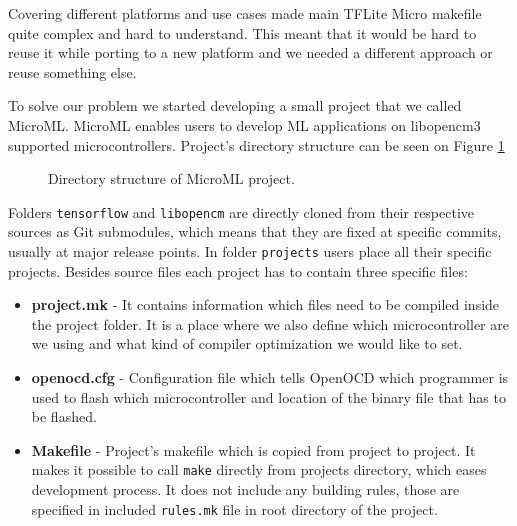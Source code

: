 Covering different platforms and use cases made main TFLite Micro makefile quite complex and hard to understand.
This meant that it would be hard to reuse it while porting to a new platform and we needed a different approach or reuse something else.

To solve our problem we started developing a small project that we called MicroML\footnotemark.
MicroML enables users to develop ML applications on libopencm3 supported microcontrollers.
Project's directory structure can be seen on Figure \ref{microml_dir}


\begin{figure}[ht] 
    \centering
    \begin{minipage}{7cm}
    \end{minipage}
    \caption{ Directory structure of MicroML project.}
    \label{microml_dir}
\end{figure}

Folders \verb|tensorflow| and \verb|libopencm| are directly cloned from their respective sources as Git submodules, which means that they are fixed at specific commits, usually at major release points.
In folder \verb|projects| users place all their specific projects.
Besides source files each project has to contain three specific files:

\begin{itemize}
    \item \textbf{project.mk} - It contains information which files need to be compiled inside the project folder. It is a place where we also define which microcontroller are we using and what kind of compiler optimization we would like to set.
    \item \textbf{openocd.cfg} - Configuration file which tells OpenOCD which programmer is used to flash which microcontroller and location of the binary file that has to be flashed.
    \item \textbf{Makefile} - Project's makefile which is copied from project to project. It makes it possible to call \verb|make| directly from projects directory, which eases development process. It does not include any building rules, those are specified in included \verb|rules.mk| file in root directory of the project.
\end{itemize}

